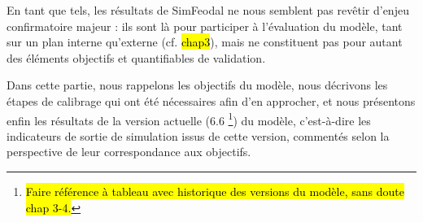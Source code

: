 En tant que tels, les \og résultats\fg{} de SimFeodal ne nous semblent pas revêtir d'enjeu confirmatoire majeur : ils sont là pour participer à l'évaluation du modèle, tant sur un plan interne qu'externe (cf. \hl{chap3}), mais ne constituent pas pour autant des éléments objectifs et quantifiables de validation.

Dans cette partie, nous rappelons les objectifs du modèle, nous décrivons les étapes de calibrage qui ont été nécessaires afin d'en approcher, et nous présentons enfin les résultats de la version actuelle (6.6
\footnote{
	\hl{Faire référence à tableau avec historique des versions du modèle, sans doute chap 3-4.}
}) du modèle, c'est-à-dire les indicateurs de sortie de simulation issus de cette version, commentés selon la perspective de leur correspondance aux objectifs.
%
%
%
%
